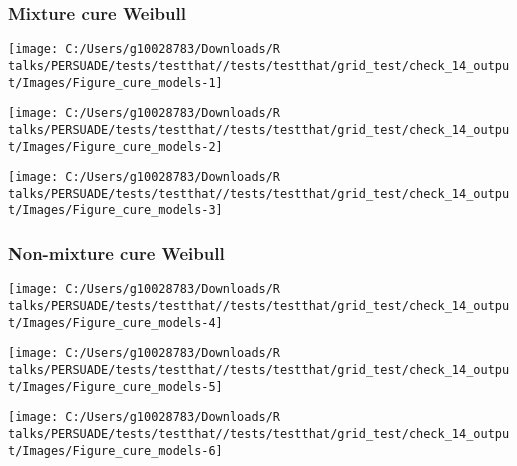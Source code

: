 \documentclass[
]{article}
\begin{document}
\clearpage

\clearpage

\subsubsection{Mixture cure Weibull}\label{mixture-cure-weibull}

\begin{flushleft}\texttt{[image: C:/Users/g10028783/Downloads/R talks/PERSUADE/tests/testthat//tests/testthat/grid\_test/check\_14\_output/Images/Figure\_cure\_models-1]} \end{flushleft}

\begin{flushleft}\texttt{[image: C:/Users/g10028783/Downloads/R talks/PERSUADE/tests/testthat//tests/testthat/grid\_test/check\_14\_output/Images/Figure\_cure\_models-2]} \end{flushleft}

\begin{flushleft}\texttt{[image: C:/Users/g10028783/Downloads/R talks/PERSUADE/tests/testthat//tests/testthat/grid\_test/check\_14\_output/Images/Figure\_cure\_models-3]} \end{flushleft}

\clearpage

\subsubsection{Non-mixture cure Weibull}\label{non-mixture-cure-weibull}

\begin{flushleft}\texttt{[image: C:/Users/g10028783/Downloads/R talks/PERSUADE/tests/testthat//tests/testthat/grid\_test/check\_14\_output/Images/Figure\_cure\_models-4]} \end{flushleft}

\begin{flushleft}\texttt{[image: C:/Users/g10028783/Downloads/R talks/PERSUADE/tests/testthat//tests/testthat/grid\_test/check\_14\_output/Images/Figure\_cure\_models-5]} \end{flushleft}

\begin{flushleft}\texttt{[image: C:/Users/g10028783/Downloads/R talks/PERSUADE/tests/testthat//tests/testthat/grid\_test/check\_14\_output/Images/Figure\_cure\_models-6]} \end{flushleft}
\end{document}

